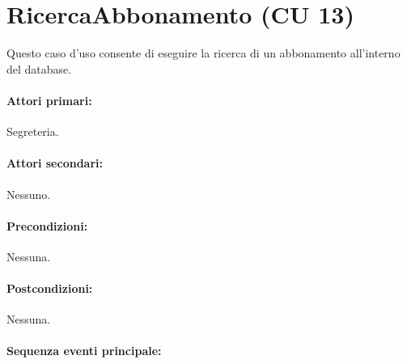 \documentclass{article}
\begin{document}
	


\newpage
\section*{RicercaAbbonamento (CU 13)}
	
	\indent\indent Questo caso d'uso consente di eseguire la ricerca di un abbonamento all'interno del database.
	
	\paragraph{Attori primari:}Segreteria.
	
	\paragraph{Attori secondari:}Nessuno.
	
	\paragraph{Precondizioni:}Nessuna.
	
	\paragraph{Postcondizioni:}Nessuna.
	
	\paragraph{Sequenza eventi principale:}
\end{document}
